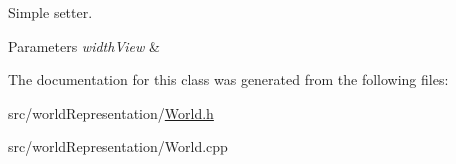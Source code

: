 Simple setter. 


\begin{DoxyParams}{Parameters}
{\em width\+View} & \\
\hline
\end{DoxyParams}


The documentation for this class was generated from the following files\+:\begin{DoxyCompactItemize}
\item 
src/world\+Representation/\hyperlink{World_8h}{World.\+h}\item 
src/world\+Representation/World.\+cpp\end{DoxyCompactItemize}
